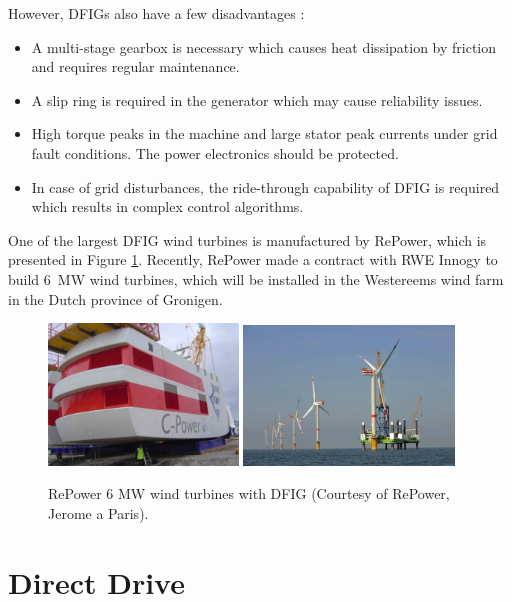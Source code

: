 \documentclass[a4paper, 11pt]{article} %
\begin{document}
However, DFIGs also have a few disadvantages \cite{Li2008a}:

\begin{itemize}
	\item A multi-stage gearbox is necessary which causes heat dissipation by friction and requires regular maintenance.
	\item A slip ring is required in the generator which may cause reliability issues.
	\item High torque peaks in the machine and large stator peak currents under grid fault conditions. The power electronics should be protected.
	\item In case of grid disturbances, the ride-through capability of DFIG is required which results in complex control algorithms.
\end{itemize}

One of the largest DFIG wind turbines is manufactured by RePower, which is presented in Figure \ref{repower}. Recently, RePower made a contract with RWE Innogy to build 6~MW wind turbines, which will be installed in the Westereems wind farm in the Dutch province of Gronigen.

\begin{figure}[]
  \centering
  \includegraphics[width=0.45\textwidth]{repower_nacelle}
  \hfill
    \includegraphics[width=0.5\textwidth]{repower_farm}
\caption{RePower 6 MW wind turbines with DFIG (Courtesy of RePower, Jerome a Paris).}
  \label{repower}
\end{figure}

\section{Direct Drive}
\end{document}
